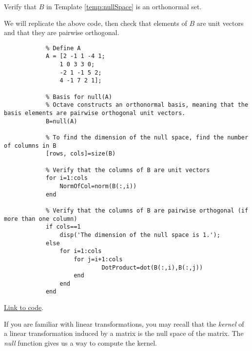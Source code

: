 \documentclass{ximera}
\begin{document}
\begin{example}\label{ex_oct_orth}
    Verify that $B$ in Template \ref{temp:nullSpace} is an orthonormal set.
    \begin{explanation}
    We will replicate the above code, then check that elements of $B$ are unit vectors and that they are pairwise orthogonal.
        \begin{verbatim}
            % Define A
            A = [2 -1 1 -4 1;
                1 0 3 3 0;
                -2 1 -1 5 2;
                4 -1 7 2 1];

            % Basis for null(A)
            % Octave constructs an orthonormal basis, meaning that the basis elements are pairwise orthogonal unit vectors.
            B=null(A)

            % To find the dimension of the null space, find the number of columns in B
            [rows, cols]=size(B)

            % Verify that the columns of B are unit vectors
            for i=1:cols
                NormOfCol=norm(B(:,i))
            end    

            % Verify that the columns of B are pairwise orthogonal (if more than one column)
            if cols==1
                disp('The dimension of the null space is 1.');
            else    
                for i=1:cols
                    for j=i+1:cols
                            DotProduct=dot(B(:,i),B(:,j))
                    end
                end
            end
        \end{verbatim}

    \href{https://sagecell.sagemath.org/?z=eJyNUk1vwjAMvVfqf_AFUbSCCNs0iSkHOs5jB7QL4lBaF4zaBCUpaPv1c_oxpm2a5kpp8-JnP790AEssSCEswmABEjYzGAsQML4D8RgGwCFgCrf8TLv9eObPBdzDrEPu_PYBGN8yEgYDSFJLFgptQNVlGS1GHlxlLj0jZFpZZ-rMWUgVaOMOWmlTpSXsPCuGClNFag_ukDpesMUBS6xQeZZBOKVkLmSx5e-1YnqtyMEZM6eNnYRBIj97--5rDTxo3hTMiStZ0ty-aACfCfaUZhhfs1Rd7dD4lEyXdaUskIIkDDZGX1gmg3YrLb1jlHQ9XtFQ8XYV3vO4RNLI_ioxDLw_JMXcV2qdfGYjVsWTLqW3JEqieUwjLo4sieOfXX4zJ6ICKs2HTOOxVU_j4tQMaKUUrYic7Ckarv_2CfhGxGQ44gvHkls16vz6c6gePUq6-Y73sdTuxeic_wqZa9cNHvvX0c_fp7EP7ab54OUDMZzNzg==&lang=octave&interacts=eJyLjgUAARUAuQ==}{Link to code}.
    \end{explanation}
\end{example}

If you are familiar with linear transformations, you may recall that the \emph{kernel} of a linear transformation induced by a matrix is the null space of the matrix.  The \emph{null} function gives us a way to compute the kernel.
\end{document}
